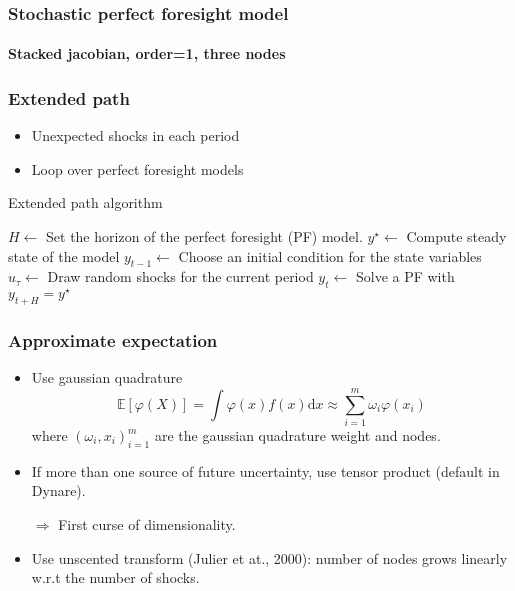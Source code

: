 \documentclass{beamer}
\begin{document}
\begin{frame}
  \frametitle{Stochastic perfect foresight model}
  \framesubtitle{Stacked jacobian, order=1, three nodes}
  \begin{center}
    \scalebox{.5}{
  }
  \end{center}
\end{frame}


\begin{frame}
  \frametitle{Extended path}

\begin{itemize}
    \item Unexpected shocks in each period\newline
    \item Loop over perfect foresight models\newline
\end{itemize}

\medskip

\begin{algorithm}[H]
  \caption{Extended path algorithm}
  \label{alg:ep}
  \begin{algorithmic}[1]
    \STATE $H \leftarrow$ Set the horizon of the perfect foresight (PF) model.
    \STATE $y^\star \leftarrow$ Compute steady state of the model
    \STATE $y_{t-1} \leftarrow$ Choose an initial condition for the state variables
    \STATE $u_\tau  \leftarrow$ Draw random shocks for the current period
    \STATE $y_t \leftarrow$ Solve a PF with $y_{t+H}=y^{\star}$
    \ENDFOR
  \end{algorithmic}
\end{algorithm}

\end{frame}


\begin{frame}
  \frametitle{Approximate expectation}

\begin{itemize}
  \item Use gaussian quadrature
\[
\mathbb E \left[\varphi (X)\right] = \int \varphi(x)f(x)\mathrm dx \approx \sum_{i=1}^m \omega_i \varphi(x_i)
\]
where $(\omega_i,x_i)_{i=1}^m$ are the gaussian quadrature weight and nodes.\newline

\item If more than one source of future uncertainty, use tensor product (default in Dynare).\newline

\item[$\Rightarrow$] First curse of dimensionality.\newline

\item Use unscented transform (Julier et at., 2000): number of nodes grows linearly w.r.t the number of shocks.

\end{itemize}

\end{frame}
\end{document}
